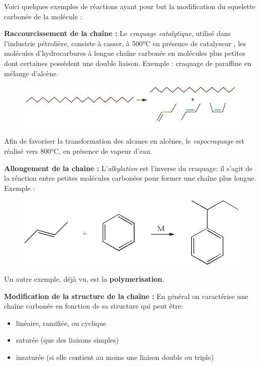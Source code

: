 \documentclass[11pt,a4paper]{article}
\begin{document}
Voici quelques exemples de réactions ayant pour but la modification du squelette carbonée de la molécule : 

\textbf{Raccourcissement de la chaîne :} 
Le \textit{craquage catalytique}, utilisé dans l’industrie pétrolière, consiste à casser, à 500°C en présence de catalyseur , les molécules d’hydrocarbures à longue chaîne carbonée en molécules plus petites dont certaines possèdent une double liaison. Exemple : craquage de paraffine en mélange d’alcène. 

\begin{figure}[h]
    \centering
    \includegraphics[width=0.8\linewidth]{imgs/c5/craquage.jpg}
\end{figure}

Afin de favoriser la transformation des alcanes en alcènes, le \textit{vapocraquage} est réalisé vers 800°C, en présence de vapeur d’eau.  

\textbf{Allongement de la chaîne : } L'\textit{alkylation} est l’inverse du craquage: il s’agit de la réaction entre petites molécules carbonées pour former une chaîne plus longue. Exemple : 
\begin{figure}[h]
    \centering
    \includegraphics[width=0.8\linewidth]{imgs/c5/alkylation.jpg}
\end{figure}

Un autre exemple, déjà vu, est la \textbf{polymerisation}. 

\textbf{Modification de la structure de la chaîne : }
En général on caractérise une chaîne carbonée en fonction de sa structure qui peut être: \begin{itemize}
    \item linéaire, ramifiée, ou cyclique
    \item saturée (que des liaisons simples)
    \item insaturée (si elle contient au moins une liaison double ou triple)
\end{itemize}
	
\end{document}
